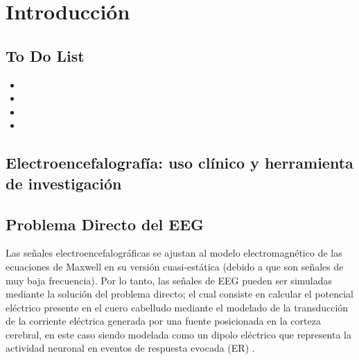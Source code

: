 %
\chapter{Introducción}
\label{sec:intro}







\section{To Do List}

\begin{itemize}
	\item {}
	\item {}
	\item {}
	\item {}
\end{itemize}


\section{Electroencefalografía: uso clínico y herramienta de investigación}

\section{Problema Directo del EEG}
\label{sec:methodology:direct}

Las señales electroencefalográficas se ajustan al modelo electromagnético de las ecuaciones de Maxwell en su versión cuasi-estática (debido a que son señales de muy baja frecuencia). Por lo tanto, las señales de EEG pueden ser simuladas mediante la solución del problema directo; el cual consiste en calcular el potencial eléctrico presente en el cuero cabelludo mediante el modelado de la transducción de la corriente eléctrica generada por una fuente posicionada en la corteza cerebral, en este caso siendo modelada como un dipolo eléctrico que representa la actividad neuronal en eventos de respuesta evocada (ER) \cite{Mosher1999, Hallez2007}. 

